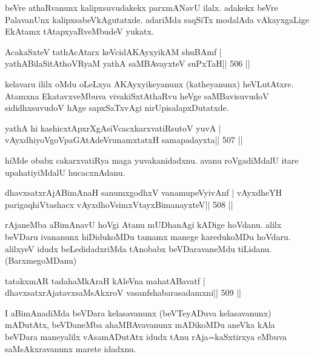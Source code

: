 \begin{artha}
beVre athaRvanunx kalipxsuvudakekx parxmANavU ilalx. adakekx beVre PalavanUnx kalipxsabeVkAgutatxde. adariMda saqSiTx modalAda vAkayxgaLige EkAtamx tAtapxyaRveMbudeV yukatx.
\end{artha}



\begin{shl}
AcakaSxteV tathAcAtarx keVcidAKAyxyikAM shuBAmf |
yathABilaSitAthoVR\s yaM yathA saMBAvayxteV suPxTaH\hfill || 506 ||
\end{shl}

\begin{artha}
kelavaru ililx oMdu oLeLxya AKAyxyikeyanunx (katheyanunx) heVLutAtxre. Atamxna EkatavxveMbuva vivakiSxtAthaRvu heVge saMBavisuvudoV sididhxsuvudoV hAge sapxSaTxvAgi nirUpisalapxDutatxde.
\end{artha}

\begin{shl}
yathA hi kashicxtApxrXgAsiVcacxkarxvatiRsutoV yuvA |
vAyxdhiyoVgoVpaGAtAdeVrunamxtatxH samapadayxta\hfill || 507 ||
\end{shl}

\begin{artha}
hiMde obabx cakarxvatiRya maga yuvakanidadxnu. avanu roVgadiMdalU
itare upahatiyiMdalU hucacxnAdanu.
\end{artha}

\begin{shl}
dhavxsatxrAjABimAnaH sanumxgodhxV vanamupeVyivAnf |
vAyxdheYH parigaqhiVtashacx vAyxdhoV\s simxVtayxBimanayxteV\hfill || 508 ||
\end{shl}

\begin{artha}
rAjaneMba aBimAnavU hoVgi Atanu mUDhanAgi kADige hoVdanu. alilx
beVDaru ivananunx hiDidukoMDu tamamx manege karedukoMDu hoVdaru.
alilxyeV idudx beLedidadxriMda tAnobabx beVDaravaneMdu tiLidanu. (BarxmegoMDanu)
\end{artha}

\begin{shl}
tatakxmAR tadahaMkAraH kAleVna mahatA\s Bavatf |
dhavxsatxrAjatavxsaMsAkxroV vasanfshabarasadamxni\hfill || 509 ||
\end{shl}

\begin{artha}
I aBimAnadiMda beVDara kelasavanunx (beVTeyADuva kelasavanunx) mADutAtx, beVDaneMba ahaMBAvavanunx mADikoMDu aneVka kAla beVDara maneyalilx vAsamADutAtx idudx tAnu rAja=kaSxtirxya eMbuva saMsAkxravanunx marete idadxnu.
\end{artha}

